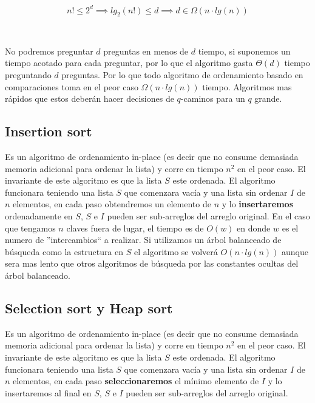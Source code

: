 \begin{equation*}
 n! \leq 2^d \implies lg_2(n!) \leq d \implies d \in \Omega(n \cdot lg(n))
\end{equation*}

~

No podremos preguntar $d$ preguntas en menos de $d$ tiempo, si suponemos un tiempo acotado para cada preguntar, por lo que el algoritmo gasta $\Theta(d)$ tiempo preguntando $d$ preguntas. Por lo que todo algoritmo de ordenamiento basado en comparaciones toma en el peor caso $\Omega(n \cdot lg(n))$ tiempo. Algoritmos mas r\'apidos que estos deber\'an hacer decisiones de $q$-caminos para un $q$ grande.

\subsection{Insertion sort}

Es un algoritmo de ordenamiento in-place (es decir que no consume demasiada memoria adicional para ordenar la lista) y corre en tiempo $n^2$ en el peor caso. El invariante de este algoritmo es que la lista $S$ este ordenada. El algoritmo funcionara teniendo una lista $S$ que comenzara vac\'ia y una lista sin ordenar $I$ de $n$ elementos, en cada paso obtendremos un elemento de $n$ y lo \textbf{insertaremos} ordenadamente en $S$, $S$ e $I$ pueden ser sub-arreglos del arreglo original. En el caso que tengamos $n$ claves fuera de lugar, el tiempo es de $O(w)$ en donde $w$ es el numero de ''intercambios`` a realizar. Si utilizamos un \'arbol balanceado de b\'usqueda como la estructura en $S$ el algoritmo se volver\'a $O(n\cdot lg(n))$ aunque sera mas lento que otros algoritmos de b\'usqueda por las constantes ocultas del \'arbol balanceado.

\subsection{Selection sort y Heap sort}

Es un algoritmo de ordenamiento in-place (es decir que no consume demasiada memoria adicional para ordenar la lista) y corre en tiempo $n^2$ en el peor caso. El invariante de este algoritmo es que la lista $S$ este ordenada. El algoritmo funcionara teniendo una lista $S$ que comenzara vac\'ia y una lista sin ordenar $I$ de $n$ elementos, en cada paso \textbf{seleccionaremos} el m\'inimo elemento de $I$ y lo insertaremos al final en $S$, $S$ e $I$ pueden ser sub-arreglos del arreglo original.

